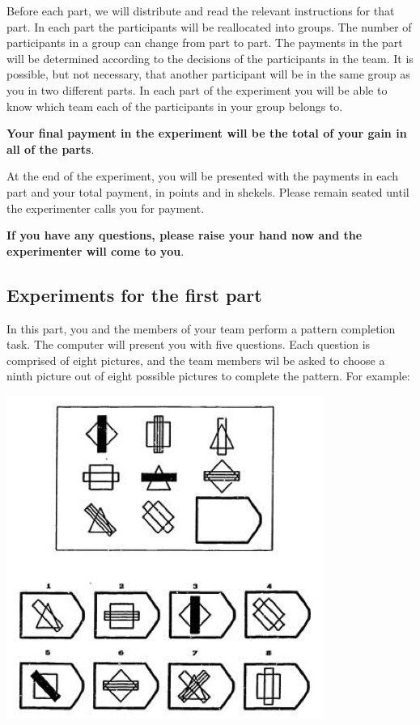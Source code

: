 Before each part, we will distribute and read the relevant instructions for that part. In each part the participants will be reallocated into groups. The number of participants in a group can change from part to part. The payments in the part will be determined according to the decisions of the participants in the team. It is possible, but not necessary, that another participant will be in the same group as you in two different parts. In each part of the experiment you will be able to know which team each of the participants in your group belongs to.

\textbf{Your final payment in the experiment will be the total of your gain in all of the parts}.

At the end of the experiment, you will be presented with the payments in each part and your total payment, in points and in shekels. Please remain seated until the experimenter calls you for payment.

\textbf{If you have any questions, please raise your hand now and the experimenter will come to you}.

\newpage

\subsection*{Experiments for the first part}

In this part, you and the members of your team perform a pattern completion task. The computer will present you with five questions. Each question is comprised of eight pictures, and the team members wil be asked to choose a ninth picture out of eight possible pictures to complete the pattern. For example:

\begin{center}
	\includegraphics[]{Raven.png}
\end{center}

